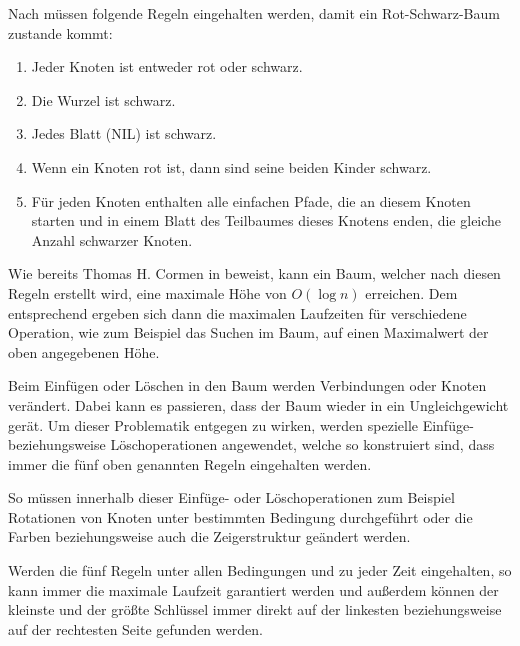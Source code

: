  
Nach \cite{tcormen} müssen folgende Regeln eingehalten werden, damit ein Rot-Schwarz-Baum zustande kommt:

\begin{enumerate}
	\item Jeder Knoten ist entweder rot oder schwarz.
	\item Die Wurzel ist schwarz.
	\item Jedes Blatt (NIL) ist schwarz.
	\item Wenn ein Knoten rot ist, dann sind seine beiden Kinder schwarz.
	\item Für jeden Knoten enthalten alle einfachen Pfade, die an diesem Knoten starten und in einem Blatt des Teilbaumes dieses Knotens enden, die gleiche Anzahl schwarzer Knoten. 
\end{enumerate}

Wie bereits Thomas H. Cormen in \cite{tcormen} beweist, kann ein Baum, welcher nach diesen Regeln erstellt wird, eine maximale Höhe von $O(\log n)$ erreichen. Dem entsprechend ergeben sich dann die maximalen Laufzeiten für verschiedene Operation, wie zum Beispiel das Suchen im Baum, auf einen Maximalwert der oben angegebenen Höhe.

Beim Einfügen oder Löschen in den Baum werden Verbindungen oder Knoten verändert. Dabei kann es passieren, dass der Baum wieder in ein Ungleichgewicht gerät. 
Um dieser Problematik entgegen zu wirken, werden spezielle Einfüge- beziehungsweise Lösch\-operationen angewendet, welche so konstruiert sind, dass immer die fünf oben genannten Regeln eingehalten werden. 

So müssen innerhalb dieser Einfüge- oder Lösch\-ope\-ra\-ti\-on\-en zum Beispiel Rotationen von Knoten unter bestimmten Bedingung durchgeführt oder die Farben beziehungsweise auch die Zeigerstruktur geändert werden.

Werden die fünf Regeln unter allen Bedingungen und zu jeder Zeit eingehalten, so kann immer die maximale Laufzeit garantiert werden und außerdem können der kleinste und der größte Schlüssel immer direkt auf der linkesten beziehungsweise auf der rechtesten Seite gefunden werden.

